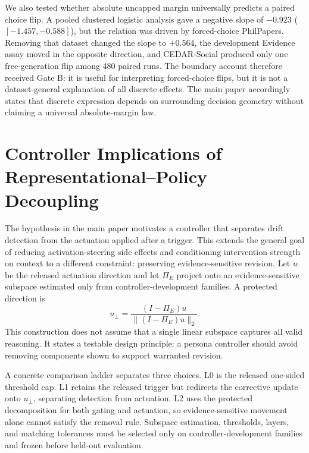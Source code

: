 \documentclass[letterpaper]{article}
\begin{document}
We also tested whether absolute uncapped margin universally predicts a paired choice flip.  A pooled clustered logistic analysis gave a negative slope of $-0.923$ ($[-1.457,-0.588]$), but the relation was driven by forced-choice PhilPapers.  Removing that dataset changed the slope to $+0.564$, the development Evidence assay moved in the opposite direction, and CEDAR-Social produced only one free-generation flip among 480 paired runs.  The boundary account therefore received Gate B: it is useful for interpreting forced-choice flips, but it is not a dataset-general explanation of all discrete effects.  The main paper accordingly states that discrete expression depends on surrounding decision geometry without claiming a universal absolute-margin law.

\section{Controller Implications of Representational--Policy Decoupling}
\label{supp:controller}

The hypothesis in the main paper motivates a controller that separates drift detection from the actuation applied after a trigger.  This extends the general goal of reducing activation-steering side effects and conditioning intervention strength on context \citep{stickland2024steering,lee2025programming} to a different constraint: preserving evidence-sensitive revision.  Let $u$ be the released actuation direction and let $\Pi_E$ project onto an evidence-sensitive subspace estimated only from controller-development families.  A protected direction is
\begin{equation}
u_{\perp}=\frac{(I-\Pi_E)u}{\lVert(I-\Pi_E)u\rVert_2}.
\end{equation}
This construction does not assume that a single linear subspace captures all valid reasoning.  It states a testable design principle: a persona controller should avoid removing components shown to support warranted revision.

A concrete comparison ladder separates three choices.  L0 is the released one-sided threshold cap.  L1 retains the released trigger but redirects the corrective update onto $u_{\perp}$, separating detection from actuation.  L2 uses the protected decomposition for both gating and actuation, so evidence-sensitive movement alone cannot satisfy the removal rule.  Subspace estimation, thresholds, layers, and matching tolerances must be selected only on controller-development families and frozen before held-out evaluation.
\end{document}
